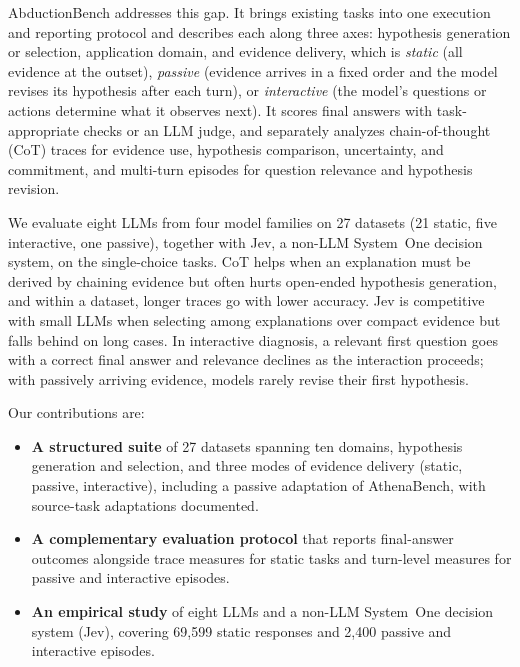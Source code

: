 AbductionBench addresses this gap. It brings existing tasks into one execution and reporting protocol and describes each along three axes: hypothesis generation or selection, application domain, and evidence delivery, which is \emph{static} (all evidence at the outset), \emph{passive} (evidence arrives in a fixed order and the model revises its hypothesis after each turn), or \emph{interactive} (the model's questions or actions determine what it observes next). It scores final answers with task-appropriate checks or an LLM judge, and separately analyzes chain-of-thought (CoT) traces for evidence use, hypothesis comparison, uncertainty, and commitment, and multi-turn episodes for question relevance and hypothesis revision.

We evaluate eight LLMs from four model families on 27 datasets (21 static, five interactive, one passive), together with Jev, a non-LLM System~One decision system, on the single-choice tasks. CoT helps when an explanation must be derived by chaining evidence but often hurts open-ended hypothesis generation, and within a dataset, longer traces go with lower accuracy. Jev is competitive with small LLMs when selecting among explanations over compact evidence but falls behind on long cases. In interactive diagnosis, a relevant first question goes with a correct final answer and relevance declines as the interaction proceeds; with passively arriving evidence, models rarely revise their first hypothesis.

Our contributions are:
\begin{itemize}
    \item \textbf{A structured suite} of 27 datasets spanning ten domains, hypothesis generation and selection, and three modes of evidence delivery (static, passive, interactive), including a passive adaptation of AthenaBench, with source-task adaptations documented.
    \item \textbf{A complementary evaluation protocol} that reports final-answer outcomes alongside trace measures for static tasks and turn-level measures for passive and interactive episodes.
    \item \textbf{An empirical study} of eight LLMs and a non-LLM System~One decision system (Jev), covering 69,599 static responses and 2,400 passive and interactive episodes.
\end{itemize}

